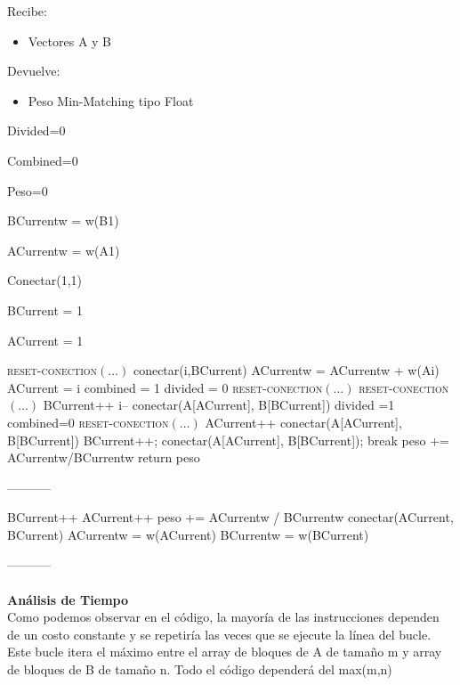 \documentclass{article}
\newcommand{\TITLE}[1]{\item[#1]}
\newcommand{\algcost}[2]{\strut\hfill\makebox[1.5cm][l]{#1}\makebox[4cm][l]{#2}}
\begin{document}
	Recibe: 
	\begin{itemize}
		\item Vectores A y B
	\end{itemize}
	Devuelve: 
	\begin{itemize}
		\item Peso Min-Matching tipo Float
	\end{itemize}
	\begin{algorithmic}[1]
		\TITLE{\textsc{Min-Matching-Voraz}$(A, B)$}
		\algcost{\textit{cost}}{\textit{times}}
		\STATE Divided=0 \algcost{$.$}{$.$}
		\STATE Combined=0 \algcost{$.$}{$.$}
		\STATE Peso=0 \algcost{$.$}{$.$} 
		\STATE BCurrentw = w(B1) \algcost{$.$}{$.$} 
		\STATE ACurrentw = w(A1) \algcost{$.$}{$.$} 
		\STATE Conectar(1,1) \algcost{$.$}{$.$} 
		\STATE BCurrent = 1 \algcost{$.$}{$.$} 
		\STATE ACurrent = 1\algcost{$.$}{$.$} 
		\STATE \textsc{reset-conection}$(...)$ 
		\ELSE 
		\STATE conectar(i,BCurrent)
		\STATE	ACurrentw = ACurrentw + w(Ai)
		\STATE	ACurrent = i
		\STATE	combined = 1
		\STATE	divided = 0
		\ENDIF
		\ELSE 
		\STATE \textsc{reset-conection}$(...)$ 
		\ENDIF
		\ELSE
		\STATE \textsc{reset-conection}$(...)$ 
		\ELSE 
		\STATE BCurrent++
		\STATE i--
		\STATE conectar(A[ACurrent], B[BCurrent])
		\STATE divided =1
		\STATE combined=0
		\ENDIF
		\ELSE
		\STATE  \textsc{reset-conection}$(...)$ 
		\ENDIF
		\STATE ACurrent++
		\STATE conectar(A[ACurrent], B[BCurrent])
		\ELSE 
			\STATE BCurrent++;
			\STATE conectar(A[ACurrent], B[BCurrent]);
		\STATE break
		\ENDIF
		\ENDIF
		\ENDIF
		\ENDFOR
		\STATE peso += ACurrentw/BCurrentw
		\STATE return peso
	\end{algorithmic}
-----------\\
	\begin{algorithmic}[1] 
	\TITLE{\textsc{Reset-conection}$( ... )$}
	\STATE BCurrent++
	\STATE ACurrent++
	\STATE peso += ACurrentw / BCurrentw 
	\STATE conectar(ACurrent, BCurrent)
	\STATE ACurrentw = w(ACurrent) 
	\STATE BCurrentw = w(BCurrent)
	\end{algorithmic}

-----------\\\\
	\textbf{Análisis de Tiempo}\\
	Como podemos observar en el código, la mayoría de las instrucciones dependen de un costo constante y se repetiría las veces que se ejecute la línea del bucle.\\Este bucle itera el máximo entre el array de bloques de A de tamaño m y  array de bloques de B de tamaño n. Todo el código dependerá del max(m,n)\\
	
\end{document}
